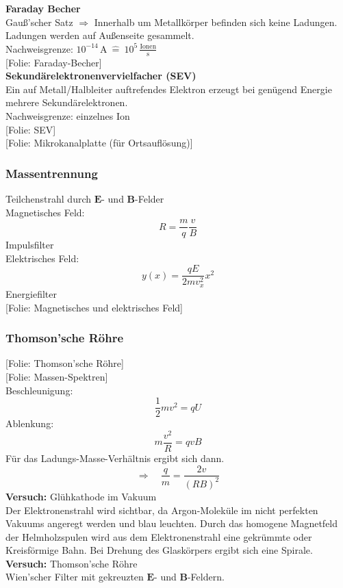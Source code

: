 \documentclass[titlepage,11pt,a4paper,ngerman]{report}
\newcommand{\tx}[1]{\textrm{#1}}
\newcommand{\folie}[1]{\color{gray}[Folie: #1]\color{black}}
\newcommand{\versuch}[1]{\color{red!50!black} \textbf{Versuch:} \color{black} #1\\ }
\renewcommand{\vec}[1]{\boldsymbol{#1}}
\begin{document}
\textbf{Faraday Becher}\\[5pt]
Gauß'scher Satz $ \Rightarrow $ Innerhalb um Metallkörper befinden sich keine Ladungen. Ladungen werden auf Außenseite gesammelt.\\[5pt]
Nachweisgrenze: $ 10^{-14} \, \tx{A} \ \widehat{=} \ 10^{5} \, \frac{\tx{Ionen}}{\tx{s}} $\\
\folie{Faraday-Becher}\\[5pt]
\textbf{Sekundärelektronenvervielfacher (SEV)}\\[5pt]

Ein auf Metall/Halbleiter auftrefendes Elektron erzeugt bei genügend Energie mehrere Sekundärelektronen.\\[5pt]
Nachweisgrenze: einzelnes Ion\\
\folie{SEV}\\
\folie{Mikrokanalplatte (für Ortsauflösung)}

\subsubsection{Massentrennung}

Teilchenstrahl durch $ \vec{E} $- und $ \vec{B} $-Felder\\
Magnetisches Feld:
\begin{equation*}
R = \frac{m}{q} \frac{v}{B}
\end{equation*}
Impulsfilter\\[5pt]
Elektrisches Feld:
\begin{equation*}
y(x) = \frac{q E}{2 m v_x^2} x^2
\end{equation*}
Energiefilter\\[5pt]
\folie{Magnetisches und elektrisches Feld}

\subsubsection{Thomson'sche Röhre}

\folie{Thomson'sche Röhre}\\
\folie{Massen-Spektren}\\
Beschleunigung:
\begin{equation*}
\frac{1}{2} m v^2 = q U
\end{equation*}
Ablenkung:
\begin{equation*}
m \frac{v^2}{R} = q v B
\end{equation*}
Für das Ladungs-Masse-Verhältnis ergibt sich dann.
\begin{equation*}
\Rightarrow \quad \frac{q}{m} = \frac{2 v}{(RB)^2}
\end{equation*}
\versuch{Glühkathode im Vakuum}
Der Elektronenstrahl wird sichtbar, da Argon-Moleküle im nicht perfekten Vakuums angeregt werden und blau leuchten. Durch das homogene Magnetfeld der Helmholzspulen wird aus dem Elektronenstrahl eine gekrümmte oder Kreisförmige Bahn. Bei Drehung des Glaskörpers ergibt sich eine Spirale.\\[5pt]
\versuch{Thomson'sche Röhre}
Wien'scher Filter mit gekreuzten $ \vec{E} $- und $ \vec{B} $-Feldern.
\end{document}
